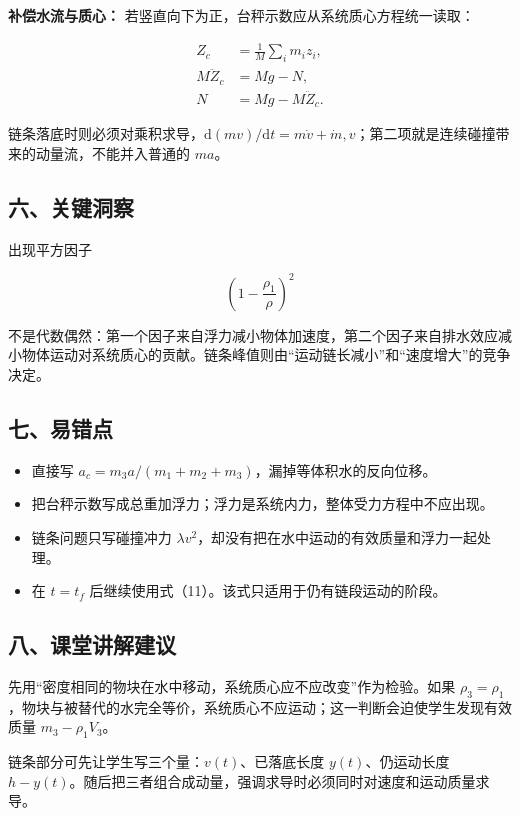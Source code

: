 \documentclass[12pt,a4paper,UTF8]{ctexart}
\newcommand{\tightlist}{\setlength{\itemsep}{0pt}\setlength{\parskip}{0pt}}
\begin{document}
\textbf{补偿水流与质心：}
若竖直向下为正，台秤示数应从系统质心方程统一读取：

\[\begin{aligned}
Z_c&=\frac1M\sum_i m_i z_i,\\
M\ddot Z_c&=Mg-N,\\
N&=Mg-M\ddot Z_c.
\end{aligned}\]

链条落底时则必须对乘积求导，\(\mathrm d(mv)/\mathrm dt=m\dot v+\dot m,v\)；第二项就是连续碰撞带来的动量流，不能并入普通的
\(ma\)。

\subsection{六、关键洞察}\label{ux516dux5173ux952eux6d1eux5bdf}

出现平方因子

\[\left(1-\frac{\rho_1}{\rho}\right)^2\]

不是代数偶然：第一个因子来自浮力减小物体加速度，第二个因子来自排水效应减小物体运动对系统质心的贡献。链条峰值则由``运动链长减小''和``速度增大''的竞争决定。

\subsection{七、易错点}\label{ux4e03ux6613ux9519ux70b9}

\begin{itemize}
\tightlist
\item
  直接写 \(a_c=m_3a/(m_1+m_2+m_3)\)，漏掉等体积水的反向位移。
\item
  把台秤示数写成总重加浮力；浮力是系统内力，整体受力方程中不应出现。
\item
  链条问题只写碰撞冲力
  \(\lambda v^2\)，却没有把在水中运动的有效质量和浮力一起处理。
\item
  在 \(t=t_f\) 后继续使用式（11）。该式只适用于仍有链段运动的阶段。
\end{itemize}

\subsection{八、课堂讲解建议}\label{ux516bux8bfeux5802ux8bb2ux89e3ux5efaux8bae}

先用``密度相同的物块在水中移动，系统质心应不应改变''作为检验。如果
\(\rho_3=\rho_1\)，物块与被替代的水完全等价，系统质心不应运动；这一判断会迫使学生发现有效质量
\(m_3-\rho_1V_3\)。

链条部分可先让学生写三个量：\(v(t)\)、已落底长度 \(y(t)\)、仍运动长度
\(h-y(t)\)。随后把三者组合成动量，强调求导时必须同时对速度和运动质量求导。
\end{document}
